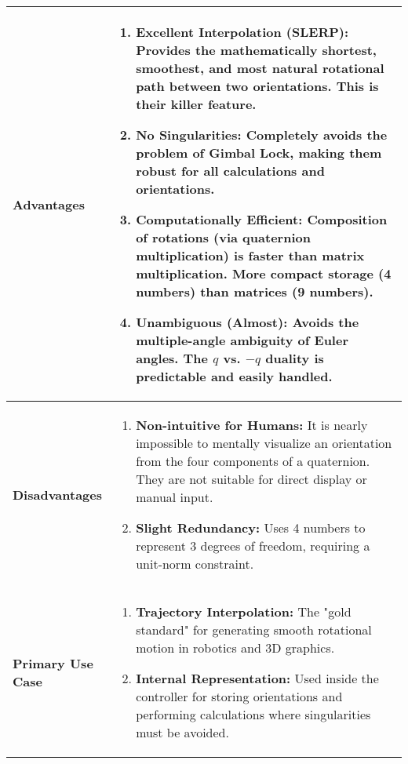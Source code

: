 \begin{longtable}{p{0.25\linewidth} p{0.75\linewidth}}
    \textbf{Advantages} &
    \vspace{-20pt}
    \begin{enumerate}
        \item \textbf{Excellent Interpolation (SLERP):} Provides the mathematically shortest, smoothest, and most natural rotational path between two orientations. This is their killer feature.
        \item \textbf{No Singularities:} Completely avoids the problem of Gimbal Lock, making them robust for all calculations and orientations.
        \item \textbf{Computationally Efficient:} Composition of rotations (via quaternion multiplication) is faster than matrix multiplication. More compact storage (4 numbers) than matrices (9 numbers).
        \item \textbf{Unambiguous (Almost):} Avoids the multiple-angle ambiguity of Euler angles. The $q$ vs. $-q$ duality is predictable and easily handled.
    \end{enumerate}
    \vspace{-20pt}
    \\
    \midrule
    \textbf{Disadvantages} &
    \vspace{-20pt}
    \begin{enumerate}
        \item \textbf{Non-intuitive for Humans:} It is nearly impossible to mentally visualize an orientation from the four components of a quaternion. They are not suitable for direct display or manual input.
        \item \textbf{Slight Redundancy:} Uses 4 numbers to represent 3 degrees of freedom, requiring a unit-norm constraint.
    \end{enumerate}
    \vspace{-20pt}
    \\
    \midrule
    \textbf{Primary Use Case} &
    \vspace{-20pt}
    \begin{enumerate}
        \item \textbf{Trajectory Interpolation:} The "gold standard" for generating smooth rotational motion in robotics and 3D graphics.
        \item \textbf{Internal Representation:} Used inside the controller for storing orientations and performing calculations where singularities must be avoided.
    \end{enumerate}
    \vspace{-20pt}
    \\
\end{longtable}


